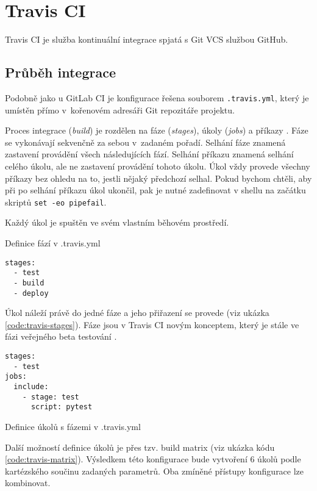 \section{Travis CI}

Travis CI je služba kontinuální integrace spjatá s Git VCS službou GitHub.

\subsection{Průběh integrace}

Podobně jako u GitLab CI je konfigurace řešena souborem \verb|.travis.yml|, který je umístěn přímo v~kořenovém adresáři Git repozitáře projektu.

Proces integrace (\textit{build}) je rozdělen na fáze (\textit{stages}), úkoly (\textit{jobs}) a příkazy \cite{travis_build}.
Fáze se vykonávají sekvenčně za sebou v~zadaném pořadí.
Selhání fáze znamená zastavení provádění všech následujících fází.
Selhání příkazu znamená selhání celého úkolu, ale ne zastavení provádění tohoto úkolu.
Úkol vždy provede všechny příkazy bez ohledu na to, jestli nějaký předchozí selhal. 
Pokud bychom chtěli, aby při po selhání příkazu úkol ukončil, pak je nutné zadefinovat v shellu na začátku skriptů \verb|set -eo pipefail|.

Každý úkol je spuštěn ve svém vlastním běhovém prostředí.

\begin{listing}[ht]
\caption{Definice fází v .travis.yml}
\begin{verbatim}
stages:
  - test
  - build
  - deploy
\end{verbatim}
\end{listing}

Úkol náleží právě do jedné fáze a jeho přiřazení se provede (viz ukázka \ref{code:travis-stages}).
Fáze jsou v Travis CI novým konceptem, který je stále ve fázi veřejného beta testování \cite{travis_stages}.

\begin{listing}[ht]
\begin{verbatim}
stages:
  - test
jobs:
  include:
    - stage: test
      script: pytest

\end{verbatim}
\caption{\label{code:travis-stages}Definice úkolů s fázemi v .travis.yml}
\end{listing}

Další možností definice úkolů je přes tzv. build matrix (viz ukázka kódu \ref{code:travis-matrix}).
Výsledkem této konfigurace bude vytvoření 6 úkolů podle kartézského součinu zadaných parametrů.
Oba zmíněné přístupy konfigurace lze kombinovat.

